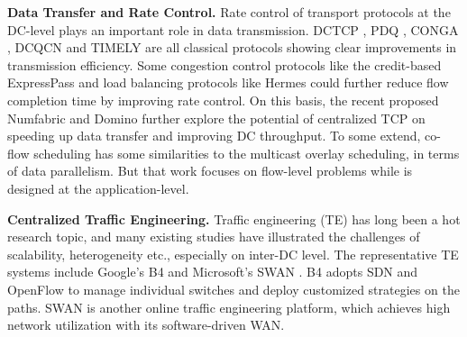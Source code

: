 \textbf{Data Transfer and Rate Control.}
Rate control of transport protocols at the DC-level plays an important role in data transmission. DCTCP \cite{Alizadeh2010Data}, PDQ \cite{Hong2012Finishing}, CONGA \cite{Alizadeh2014CONGA}, DCQCN \cite{Zhu2015Congestion} and TIMELY \cite{Mittal2015TIMELY} are all classical protocols showing clear improvements in transmission efficiency. Some congestion control protocols like the credit-based ExpressPass \cite{Han2017Credit} and load balancing protocols like Hermes \cite{Zhang2017Resilient} could further reduce flow completion time by improving rate control. On this basis, the recent proposed Numfabric \cite{nagaraj2016numfabric} and Domino \cite{sivaraman2016packet} further explore the potential of centralized TCP on speeding up data transfer and improving DC throughput. To some extend, co-flow scheduling \cite{Chowdhury2012Coflow,Zhang2016CODA} has some similarities to the multicast overlay scheduling, in terms of data parallelism. But that work focuses on flow-level problems while \name is designed at the application-level.%

\textbf{Centralized Traffic Engineering.} Traffic engineering (TE) has long been a hot research topic, and many existing studies \cite{chen2012design, kavulya2010analysis, mishra2010towards, reiss2012heterogeneity, sharma2011modeling, More, zhang2011characterizing} have illustrated the challenges of scalability, heterogeneity etc., especially on inter-DC level. The representative TE systems include Google's B4 \cite{jain2013b4} and Microsoft's SWAN \cite{hong2013achieving}. B4 adopts SDN \cite{mckeown2009software} and OpenFlow \cite{OpenFlow,mckeown2008openflow} to manage individual switches and deploy customized strategies on the paths. SWAN is another online traffic engineering platform, which achieves high network utilization with its software-driven WAN. %

